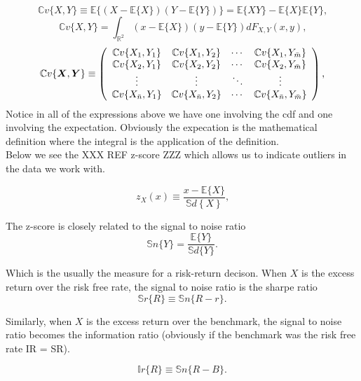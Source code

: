 \documentclass[../main.tex]{subfiles}
\begin{document}
\[
    \mathbb{C}v\{X,Y\}\equiv\mathbb{E}\{(X-\mathbb{E}\{X\})(Y-\mathbb{E}\{Y\})\}=\mathbb{E}\{XY\}-\mathbb{E}\{X\}\mathbb{E}\{Y\}\text{,}
\]
\[
\mathbb{C}v\{X,Y\}=\int\nolimits_{\mathbb{R}^{2}}(x-\mathbb{E}\{X\})(y-\mathbb{E}\{Y\})dF_{X,Y}(x,y)\text{,}
\]
\[
    \mathbb{C}v\{\boldsymbol{X},\boldsymbol{Y}\}\equiv\left( \begin{array}
        [c]{cccc}\mathbb{C}v\{X_{1},Y_{1}\} & \mathbb{C}v\{X_{1},Y_{2}\} & \cdots & \mathbb{C}v\{X_{1},Y_{\bar{m}}\}\\
        \mathbb{C}v\{X_{2},Y_{1}\} & \mathbb{C}v\{X_{2},Y_{2}\} & \cdots & \mathbb{C}v\{X_{2},Y_{\bar{m}}\}\\
        \vdots & \vdots & \ddots & \vdots\\
        \mathbb{C}v\{X_{\bar{n}},Y_{1}\} & \mathbb{C}v\{X_{\bar{n}},Y_{2}\} & \cdots & \mathbb{C}v\{X_{\bar{n}},Y_{\bar{m}}\}
        \end{array} \right) \text{,}
\]
Notice in all of the expressions above we have one involving the cdf and one involving 
the expectation. Obviously the expecation is the mathematical definition where the integral is the application
of the definition. \\
Below we see the XXX REF z-score ZZZ which allows us to
indicate outliers in the data we work with.

\begin{equation}
    z_{X}(x)\equiv\dfrac{x-\mathbb{E}\{X\}}{\mathbb{S}\mathit{d}\left\{ X\right\} }\text{,}
    \end{equation}

The z-score is closely related to the signal to noise ratio 
\begin{equation}
    \mathbb{S}\mathit{n}\{Y\}=\frac{\mathbb{E}\{Y\}}{\mathbb{S}\mathit{d}\{Y\}}\text{.}
\end{equation}

Which is the usually the measure for a risk-return decison. When $X$ is the 
excess return over the risk free rate, the signal to noise ratio is the sharpe ratio
\begin{equation}
    \mathbb{S}\mathit{r}\{R\}\equiv\mathbb{S}\mathit{n}\{R-r\}\text{.}
    \end{equation}



Similarly, when $X$ is the excess return over the benchmark, 
the signal to noise ratio becomes the information ratio (obviously if the benchmark was the risk free rate IR = SR).

\begin{equation}
    \mathbb{I}\mathit{r}\{R\}\equiv\mathbb{S}\mathit{n}\{R-B\}\text{.}
    \end{equation}
\end{document}
